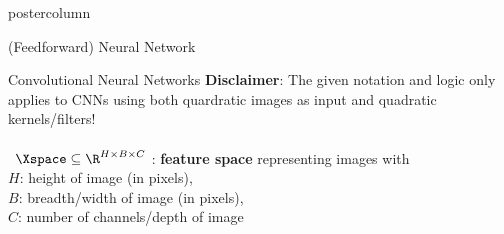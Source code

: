 \documentclass{beamer}
\begin{document}
\begin{frame}[fragile]{}
\begin{columns}
\begin{column}{.31\textwidth}
\begin{beamercolorbox}[center]{postercolumn}
\begin{minipage}{.98\textwidth}
{\begin{myblock}{(Feedforward) Neural Network}
\begin{itemize}
\end{itemize}

\end{myblock}



\begin{myblock}{Convolutional Neural Networks}
\textbf{Disclaimer}: The given notation and logic only applies to CNNs using
both quardratic images as input and quadratic kernels/filters! \\ 
\\ \
 $\Xspace \subseteq \R^{H \times B \times C}$ : \textbf{feature space} representing images with 
\\ $H$: height of image (in pixels), \\
 $B$: breadth/width of image (in pixels), \\ 
 $C$: number of channels/depth of image 
 \end{myblock}

}
\end{minipage}
\end{beamercolorbox}
\end{column}
\end{columns}
\end{frame}
\end{document}
